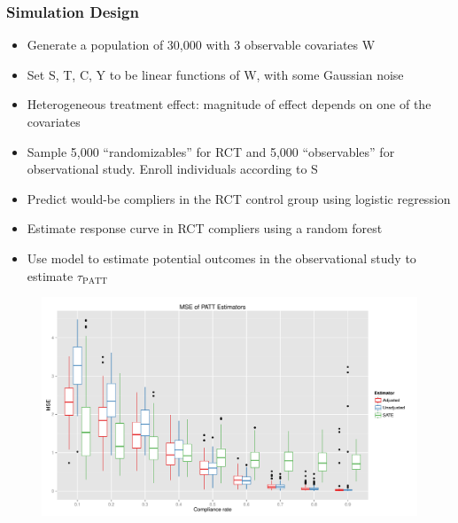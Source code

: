 \documentclass{beamer}
\begin{document}
\begin{frame}
\frametitle{Simulation Design}
\begin{itemize}
\item Generate a population of 30,000 with 3 observable covariates W
\item Set S, T, C, Y to be linear functions of W, with some Gaussian noise
\item Heterogeneous treatment effect: magnitude of effect depends on one of the covariates
\item Sample 5,000 ``randomizables'' for RCT and 5,000 ``observables'' for observational study. Enroll individuals according to S
\item Predict would-be compliers in the RCT control group using logistic regression
\item Estimate response curve in RCT compliers using a random forest
\item Use model to estimate potential outcomes in the observational study to estimate $\tau_{\text{PATT}}$
\end{itemize}
\end{frame}

\begin{frame}
\begin{figure}[htbp]
\centering
   \includegraphics[width=\linewidth]{../paper/mse_boxplots_B5.pdf} 
\label{simulation-plot}
\end{figure}
\end{frame}
\end{document}
